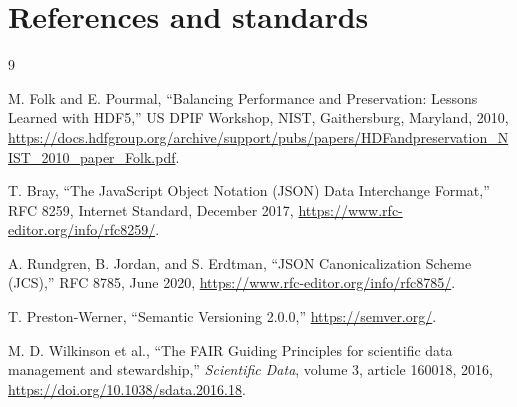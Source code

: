 \documentclass[11pt]{article}
\begin{document}
\section{References and standards}
\label{app:references}

\begin{thebibliography}{9}

M. Folk and E. Pourmal,
``Balancing Performance and Preservation: Lessons Learned with HDF5,''
US DPIF Workshop, NIST, Gaithersburg, Maryland, 2010,
\url{https://docs.hdfgroup.org/archive/support/pubs/papers/HDFandpreservation_NIST_2010_paper_Folk.pdf}.

T. Bray,
``The JavaScript Object Notation (JSON) Data Interchange Format,''
RFC 8259, Internet Standard, December 2017,
\url{https://www.rfc-editor.org/info/rfc8259/}.

A. Rundgren, B. Jordan, and S. Erdtman,
``JSON Canonicalization Scheme (JCS),''
RFC 8785, June 2020,
\url{https://www.rfc-editor.org/info/rfc8785/}.

T. Preston-Werner,
``Semantic Versioning 2.0.0,''
\url{https://semver.org/}.

M. D. Wilkinson et al.,
``The FAIR Guiding Principles for scientific data management and stewardship,''
\emph{Scientific Data}, volume 3, article 160018, 2016,
\url{https://doi.org/10.1038/sdata.2016.18}.

\end{thebibliography}
\end{document}
